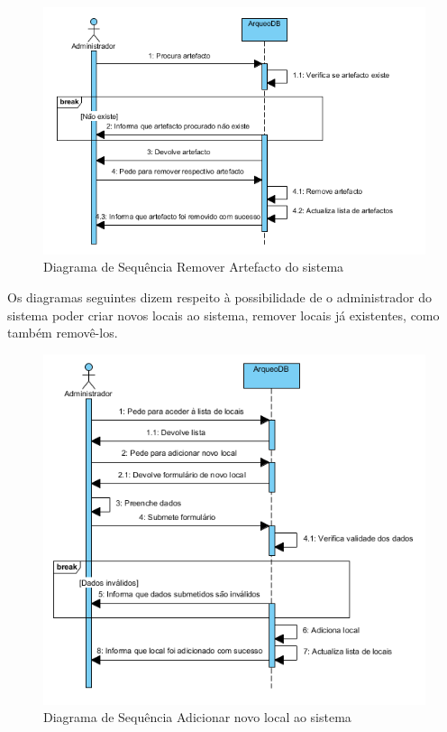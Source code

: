 ﻿\documentclass[12pt,a4paper]{article}
\begin{document}
\begin{figure}[h!]
\centering
\includegraphics[scale=1]{sequencia/A_removerartefacto}
\caption{Diagrama de Sequência Remover Artefacto do sistema} 
\end{figure}  
  
  
\clearpage
Os diagramas seguintes dizem respeito à possibilidade de o administrador do sistema poder criar novos locais ao sistema, remover locais já existentes, como também removê-los.\\

\begin{figure}[h!]
\centering
\includegraphics[scale=1]{sequencia/A_adicionarlocal}
\caption{Diagrama de Sequência Adicionar novo local ao sistema} 
\end{figure}  
\end{document}
